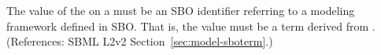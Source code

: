 The value of the   on a \Model must be an SBO
identifier referring to a modeling framework defined in SBO.  That is, the
value must be a term derived from \sboframework.  (References: SBML L2v2
Section~\ref{sec:model-sboterm}.)
